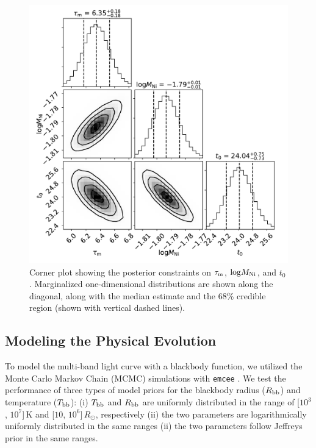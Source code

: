 \documentclass[twocolumn]{aastex63}
\begin{document}
\begin{CJK*}{UTF8}{gbsn}
\begin{figure}[htbp!]
	\centering
	\includegraphics[width=\columnwidth]{figures/corner_arnett_modified_all.pdf}
	\caption{Corner plot showing the posterior constraints on $\tau_{\rm m}$, ${\rm log}M_{\rm 
			Ni}$, and $t_0$. Marginalized one-dimensional distributions are shown along the 
		diagonal, along with the median estimate and the 68\% credible region (shown with vertical 
		dashed 
		lines).	\label{fig:Nidecaycorner}}
\end{figure}
\subsection{Modeling the Physical Evolution} \label{subsec:bbfit}
To model the multi-band light curve with a blackbody function, we utilized the Monte Carlo Markov 
Chain (MCMC) simulations with \texttt{emcee} \citep{Foreman-Mackey2013}. We test the performance 
of three types of model priors for 
the blackbody radius ($R_{\rm bb}$) and temperature ($T_{\rm bb}$): (i) $T_{\rm bb}$ 
and $R_{\rm bb}$ are uniformly distributed in the range of [$10^3$, $10^7$]\,K and [$10$, 
$10^6$]\,$R_\odot$, respectively (ii) the two parameters are logarithmically uniformly 
distributed in the same ranges (ii) the two parameters follow Jeffreys prior \citep{jeffreys1946invariant} 
in the same ranges.


\end{CJK*}
\end{document}
